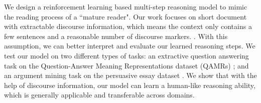 We design a reinforcement learning based multi-step reasoning model to mimic the reading process of a ``mature reader". Our work focuses on short document with extractable discourse information, which means the context only contains a few sentences and a reasonable number of discourse markers. . With this assumption, we can better interpret and evaluate our learned reasoning steps. %
We test our model on two different types of tasks: an extractive question answering task on the Question-Answer Meaning Representations dataset (QAMRs) \cite{DBLP:conf/naacl/MichaelSHDZ18}; and an argument mining task \cite{DBLP:conf/lrec/ReedPRM08} on the persuasive essay dataset \cite{DBLP:conf/coling/StabG14}. We show that with the help of discourse information, our model can learn a human-like reasoning ability, which is generally applicable and transferable across domains.
